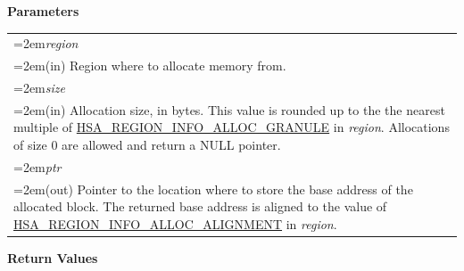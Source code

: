 \documentclass[final]{book}
\newcommand{\hsaarg}[1]{\textit{#1}}
\begin{document}
\noindent\textbf{Parameters}\\[-6mm]
\noindent\begin{longtable}{@{}>{\hangindent=2em}p{\textwidth}}
\hsaarg{region}\\\hspace{2em}(in) Region where to allocate memory from.\\[2mm]
\hsaarg{size}\\\hspace{2em}(in) Allocation size, in bytes. This value is rounded up to the the nearest multiple of \hyperlink{group__memory_1ggad35755078ff15f645c6c25e7f7ef2707ab602c01f90962314de88fb887b6f13b3}{HSA_\-REGION_\-INFO_\-ALLOC_\-GRANULE} in \textit{region}. Allocations of size 0 are allowed and return a NULL pointer.\\[2mm]
\hsaarg{ptr}\\\hspace{2em}(out) Pointer to the location where to store the base address of the allocated block. The returned base address is aligned to the value of \hyperlink{group__memory_1ggad35755078ff15f645c6c25e7f7ef2707af3103bc1328080b236a7847f1bf4998e}{HSA_\-REGION_\-INFO_\-ALLOC_\-ALIGNMENT} in \textit{region}.
\end{longtable}
\vspace{-5mm}\noindent\textbf{Return Values}\\[-6mm]
\end{document}
